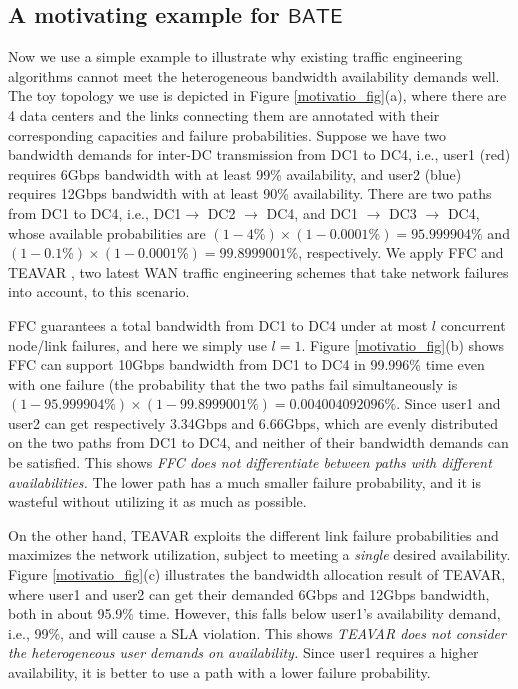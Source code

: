 \documentclass[sigconf]{acmart}
\begin{document}
\subsection{A motivating example for $\mathsf{BATE}$}
Now we use a simple example to illustrate why existing traffic engineering algorithms cannot 
meet the heterogeneous bandwidth availability demands well. The toy topology we use is depicted 
in Figure \ref{motivatio_fig}(a), where there are 4 data centers and the links connecting them 
are annotated with their corresponding capacities and failure probabilities. Suppose we have two 
bandwidth demands for inter-DC transmission from DC1 to DC4, i.e., user1 (red) requires 6Gbps bandwidth 
with at least 99\% availability, and user2 (blue) requires 12Gbps bandwidth with at least 90\% availability. 
There are two paths from DC1 to DC4, i.e., DC1$\to$ DC2 $\to$ DC4, and DC1 $\to$ DC3 $\to$ DC4, whose available probabilities are $(1-4\%) \times (1-0.0001\%)=95.999904\%$ and $(1-0.1\%) \times (1-0.0001\%) = 99.8999001\%$, respectively. We apply FFC \cite{FFC} and TEAVAR \cite{Teavar}, two latest WAN traffic engineering schemes that take network failures into account, to this scenario. 

FFC \cite{FFC} guarantees a total bandwidth from DC1 to DC4 under at most $l$ concurrent node/link failures, and here we simply use $l=1$. Figure \ref{motivatio_fig}(b) shows FFC can support 10Gbps bandwidth from DC1 to DC4 in 99.996\% time even with one failure (the probability that the two paths fail simultaneously is $(1-95.999904\%) \times (1-99.8999001\%) = 0.004004092096\%$. Since user1 and user2 can get respectively 3.34Gbps and 6.66Gbps, which are evenly distributed on the two paths from DC1 to DC4, 
and neither of their bandwidth demands can be satisfied. This shows \textit{FFC does not differentiate between paths with different availabilities.} The lower path has a much smaller failure probability, and it is wasteful without utilizing it as much as possible. 

On the other hand, TEAVAR \cite{Teavar} exploits the different link failure probabilities and maximizes the network utilization, subject to meeting a \textit{single} desired availability. Figure \ref{motivatio_fig}(c) illustrates the bandwidth allocation result of TEAVAR, where user1 and user2 can get their demanded 6Gbps and 12Gbps bandwidth, both in about 95.9\% time. However, this falls below 
user1's availability demand, i.e., 99\%, and will cause a SLA violation. 
This shows  \textit{TEAVAR does not consider the heterogeneous user demands on availability.} 
Since user1 requires a higher availability, it is better to use a path with a lower failure probability. 
\end{document}
